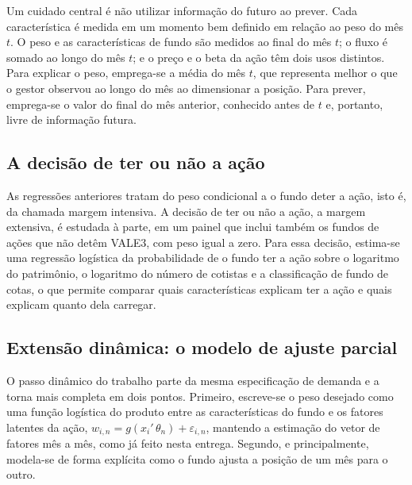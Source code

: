 \documentclass[12pt,a4paper]{article}
\begin{document}
Um cuidado central é não utilizar informação do futuro ao prever. Cada característica é
medida em um momento bem definido em relação ao peso do mês $t$. O peso e as características de
fundo são medidos ao final do mês $t$; o fluxo é somado ao longo do mês $t$; e o preço e o
beta da ação têm dois usos distintos. Para explicar o peso, emprega-se a média do mês $t$, que
representa melhor o que o gestor observou ao longo do mês ao dimensionar a posição. Para
prever, emprega-se o valor do final do mês anterior, conhecido antes de $t$ e, portanto, livre
de informação futura.

\subsection{A decisão de ter ou não a ação}

As regressões anteriores tratam do peso condicional a o fundo deter a ação, isto é, da
chamada margem intensiva. A decisão de ter ou não a ação, a margem extensiva, é estudada à
parte, em um painel que inclui também os fundos de ações que não detêm VALE3, com peso igual
a zero. Para essa decisão, estima-se uma regressão logística da probabilidade de o fundo ter
a ação sobre o logaritmo do patrimônio, o logaritmo do número de cotistas e a classificação
de fundo de cotas, o que permite comparar quais características explicam ter a ação e quais
explicam quanto dela carregar.

\subsection{Extensão dinâmica: o modelo de ajuste parcial}

O passo dinâmico do trabalho parte da mesma especificação
de demanda e a torna mais completa em dois pontos. Primeiro, escreve-se o peso desejado como
uma função logística do produto entre as características do fundo e os fatores latentes da
ação, $w_{i,n} = g(x_i'\,\theta_n) + \varepsilon_{i,n}$, mantendo a estimação do vetor de
fatores mês a mês, como já feito nesta entrega. Segundo, e principalmente, modela-se de forma
explícita como o fundo ajusta a posição de um mês para o outro.
\end{document}
